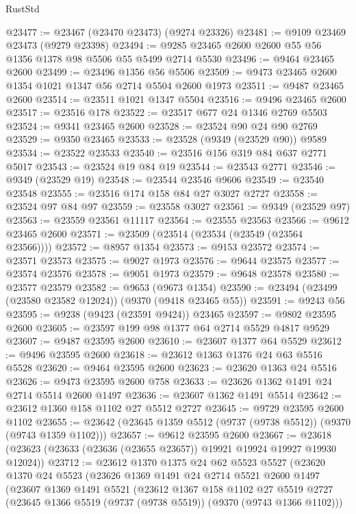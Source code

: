\begin{lexlean}{RustStd}
\begin{coremodule}
@23477 := @23467 (@23470 @23473) (@9274 @23326)
@23481 := @9109 @23469 @23473 (@9279 @23398)
@23494 := @9285 @23465 @2600 @2600 @55 @56 @1356 @1378 @98 @5506 @55 @5499 @2714 @5530
@23496 := @9464 @23465 @2600
@23499 := @23496 @1356 @56 @5506
@23509 := @9473 @23465 @2600 @1354 @1021 @1347 @56 @2714 @5504 @2600 @1973
@23511 := @9487 @23465 @2600
@23514 := @23511 @1021 @1347 @5504
@23516 := @9496 @23465 @2600
@23517 := @23516 @178
@23522 := @23517 @677 @24 @1346 @2769 @5503
@23524 := @9341 @23465 @2600
@23528 := @23524 @90 @24 @90 @2769
@23529 := @9350 @23465
@23533 := @23528 (@9349 (@23529 @90)) @9589
@23534 := @23522 @23533
@23540 := @23516 @156 @319 @84 @637 @2771 @5017
@23543 := @23524 @19 @84 @19
@23544 := @23543 @2771
@23546 := @9349 (@23529 @19)
@23548 := @23544 @23546 @9606
@23549 := @23540 @23548
@23555 := @23516 @174 @158 @84 @27 @3027 @2727
@23558 := @23524 @97 @84 @97
@23559 := @23558 @3027
@23561 := @9349 (@23529 @97)
@23563 := @23559 @23561 @11117
@23564 := @23555 @23563
@23566 := @9612 @23465 @2600
@23571 := @23509 (@23514 (@23534 (@23549 (@23564 @23566))))
@23572 := @8957 @1354
@23573 := @9153 @23572
@23574 := @23571 @23573
@23575 := @9027 @1973
@23576 := @9644 @23575
@23577 := @23574 @23576
@23578 := @9051 @1973
@23579 := @9648 @23578
@23580 := @23577 @23579
@23582 := @9653 (@9673 @1354)
@23590 := @23494 (@23499 (@23580 @23582 @12024)) (@9370 (@9418 @23465 @55))
@23591 := @9243 @56
@23595 := @9238 (@9423 (@23591 @9424)) @23465
@23597 := @9802 @23595 @2600
@23605 := @23597 @199 @98 @1377 @64 @2714 @5529 @4817 @9529
@23607 := @9487 @23595 @2600
@23610 := @23607 @1377 @64 @5529
@23612 := @9496 @23595 @2600
@23618 := @23612 @1363 @1376 @24 @63 @5516 @5528
@23620 := @9464 @23595 @2600
@23623 := @23620 @1363 @24 @5516
@23626 := @9473 @23595 @2600 @758
@23633 := @23626 @1362 @1491 @24 @2714 @5514 @2600 @1497
@23636 := @23607 @1362 @1491 @5514
@23642 := @23612 @1360 @158 @1102 @27 @5512 @2727
@23645 := @9729 @23595 @2600 @1102
@23655 := @23642 (@23645 @1359 @5512 (@9737 (@9738 @5512)) (@9370 (@9743 @1359 @1102)))
@23657 := @9612 @23595 @2600
@23667 := @23618 (@23623 (@23633 (@23636 (@23655 @23657)) @19921 @19924 @19927 @19930 @12024))
@23712 := @23612
    @1370
    @1375
    @24
    @62
    @5523
    @5527
    (@23620
      @1370
      @24
      @5523
      (@23626
        @1369
        @1491
        @24
        @2714
        @5521
        @2600
        @1497
        (@23607
          @1369
          @1491
          @5521
          (@23612
            @1367
            @158
            @1102
            @27
            @5519
            @2727
            (@23645 @1366 @5519 (@9737 (@9738 @5519)) (@9370 (@9743 @1366 @1102)))

\end{coremodule}
\end{lexlean}

